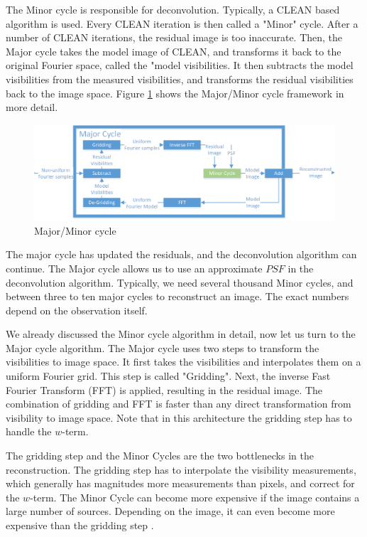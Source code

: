 The Minor cycle is responsible for deconvolution. Typically, a CLEAN based algorithm is used. Every CLEAN iteration is then called a "Minor" cycle. After a number of CLEAN iterations, the residual image is too inaccurate. Then, the Major cycle takes the model image of CLEAN, and transforms it back to the original Fourier space, called the "model visibilities. It then subtracts the model visibilities from the measured visibilities, and transforms the residual visibilities back to the image space. Figure \ref{radio:major:figure} shows the Major/Minor cycle framework in more detail.

\begin{figure}[h]
	\centering
	\includegraphics[width=0.8\linewidth]{./chapters/01.intro/Major-Minor4.png}
	\caption{Major/Minor cycle}
	\label{radio:major:figure}
\end{figure}

The major cycle has updated the residuals, and the deconvolution algorithm can continue. The Major cycle allows us to use an approximate $PSF$ in the deconvolution algorithm. Typically, we need several thousand Minor cycles, and between three to ten major cycles to reconstruct an image. The exact numbers depend on the observation itself.

We already discussed the Minor cycle algorithm in detail, now let us turn to the Major cycle algorithm. The Major cycle uses two steps to transform the visibilities to image space. It first takes the visibilities and interpolates them on a uniform Fourier grid. This step is called "Gridding". Next, the inverse Fast Fourier Transform (FFT) is applied, resulting in the residual image. The combination of gridding and FFT is faster than any direct transformation from visibility to image space. Note that in this architecture the gridding step has to handle the $w$-term.

The gridding step and the Minor Cycles are the two bottlenecks in the reconstruction. The gridding step has to interpolate the visibility measurements, which generally has magnitudes more measurements than pixels, and correct for the $w$-term. The Minor Cycle can become more expensive if the image contains a large number of sources. Depending on the image, it can even become more expensive than the gridding step \cite{offringa2017optimized}.

